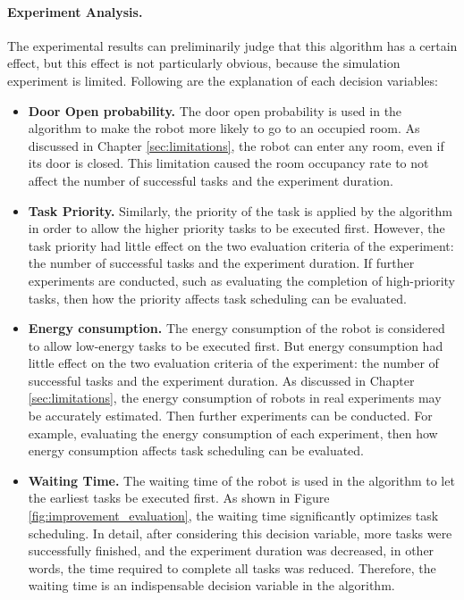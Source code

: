 \paragraph{Experiment Analysis.} 

The experimental results can preliminarily judge that this algorithm has a certain effect, but this effect is not particularly obvious, because the simulation experiment is limited. Following are the explanation of each decision variables:

\begin{itemize}
 \item \textbf{Door Open probability.} The door open probability is used in the algorithm to make the robot more likely to go to an occupied room. As discussed in Chapter \ref{sec:limitations}, the robot can enter any room, even if its door is closed. This limitation caused the room occupancy rate to not affect the number of successful tasks and the experiment duration.
 \item \textbf{Task Priority.} Similarly, the priority of the task is applied by the algorithm in order to allow the higher priority tasks to be executed first. However, the task priority had little effect on the two evaluation criteria of the experiment: the number of successful tasks and the experiment duration. If further experiments are conducted, such as evaluating the completion of high-priority tasks, then how the priority affects task scheduling can be evaluated.
 \item \textbf{Energy consumption.} The energy consumption of the robot is considered to allow low-energy tasks to be executed first. But energy consumption had little effect on the two evaluation criteria of the experiment: the number of successful tasks and the experiment duration. As discussed in Chapter \ref{sec:limitations}, the energy consumption of robots in real experiments may be accurately estimated. Then further experiments can be conducted. For example, evaluating the energy consumption of each experiment, then how energy consumption affects task scheduling can be evaluated.
 \item \textbf{Waiting Time.} The waiting time of the robot is used in the algorithm to let the earliest tasks be executed first. As shown in Figure \ref{fig:improvement_evaluation}, the waiting time significantly optimizes task scheduling. In detail, after considering this decision variable, more tasks were successfully finished, and the experiment duration was decreased, in other words, the time required to complete all tasks was reduced. Therefore, the waiting time is an indispensable decision variable in the algorithm.
\end{itemize}

